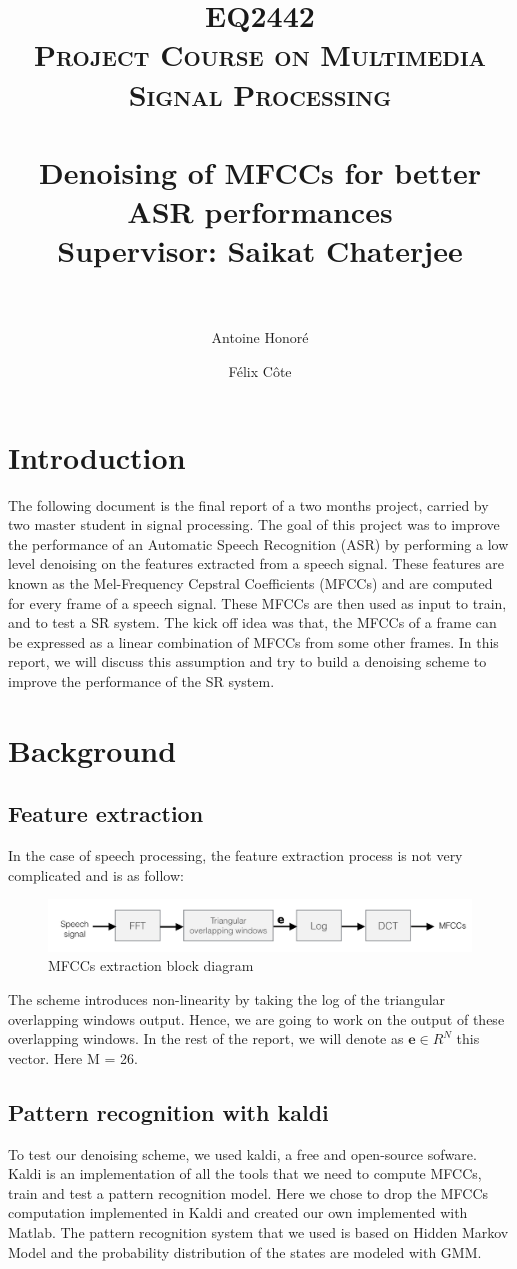 \documentclass[a4paper]{report}
\title{	 
\textsc{EQ2442\\Project Course on Multimedia Signal Processing}\\[25pt] 
\horrule{1pt} \\[0.4cm] %
\huge {Denoising of MFCCs for better ASR performances} \\[0.4 cm] %
\Large{Supervisor: Saikat Chaterjee}\\[0.4 cm]
\horrule{2pt} \\[0.2cm] %
}
\author{ Antoine Honoré\\ \email{honore@kth.se} \and Félix Côte\\\email{fcote@kth.se} }
\begin{document}
\maketitle
\tableofcontents
\section*{Introduction}
The following document is the final report of a two months project, carried by two master student in signal processing. The goal of this project was to improve the performance of an Automatic Speech Recognition (ASR) by performing a low level denoising on the features extracted from  a speech signal. These features are known as the Mel-Frequency Cepstral Coefficients (MFCCs) and are computed for every frame of a speech signal. These MFCCs are then used as input to train, and to test a SR system. The kick off idea was that, the MFCCs of a frame can be expressed as a linear combination of MFCCs from some other frames. In this report, we will discuss this assumption and try to build a denoising scheme to improve the performance of the SR system.
\section{Background}
\subsection{Feature extraction}
In the case of speech processing, the feature extraction process is not very complicated and is as follow:
\begin{figure}[!ht]
\centering
\includegraphics[scale= .3]{feature_extraction}
\caption{MFCCs extraction block diagram}
\label{feature_extraction}
\end{figure}
The scheme introduces non-linearity by taking the log of the triangular overlapping windows output. Hence, we are going to work on the output of these overlapping windows. In the rest of the report, we will denote as $\textbf{e} \in R^N$ this vector. Here M = 26.

\subsection{Pattern recognition with kaldi}
To test our denoising scheme, we used kaldi, a free and open-source sofware. Kaldi is an implementation of all the tools that we need to compute MFCCs, train and test a pattern recognition model. Here we chose to drop the MFCCs computation implemented in Kaldi and created our own implemented with Matlab. The pattern recognition system that we used is based on Hidden Markov Model and the probability distribution of the states are modeled with GMM.
\end{document}
